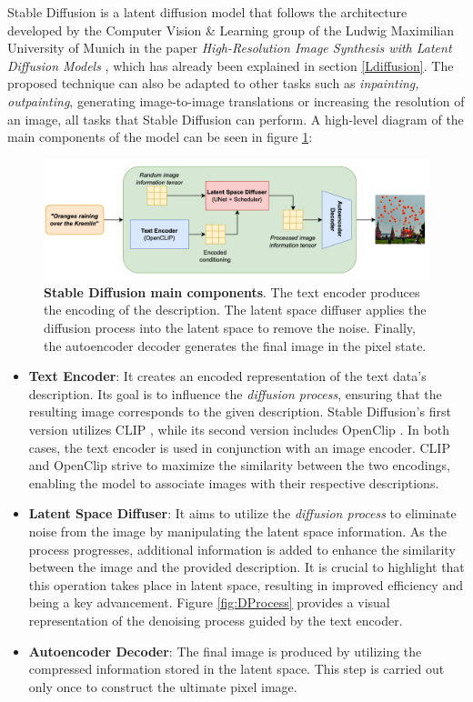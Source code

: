 Stable Diffusion is a latent diffusion model that follows the architecture developed by the Computer Vision \& Learning group of the Ludwig Maximilian University of Munich in the paper \textit{High-Resolution Image Synthesis with Latent Diffusion Models} \cite{rombach2022high}, which has already been explained in section \ref{Ldiffusion}. The proposed technique can also be adapted to other tasks such as \textit{inpainting, outpainting}, generating image-to-image translations or increasing the resolution of an image, all tasks that Stable Diffusion can perform. A high-level diagram of the main components of the model can be seen in figure \ref{fig:SDdiagram}:

\begin{figure}
    \centering
    \includegraphics[width=1\textwidth]{Pictures/SDdiagram.png} 
    \caption{\textbf{Stable Diffusion main components}. The text encoder produces the encoding of the description. The latent space diffuser applies the diffusion process into the latent space to remove the noise. Finally, the autoencoder decoder generates the final image in the pixel state.}
    \label{fig:SDdiagram}
\end{figure}

\begin{itemize}
    \item \textbf{Text Encoder}: It creates an encoded representation of the text data's description. Its goal is to influence the \textit{diffusion process}, ensuring that the resulting image corresponds to the given description. Stable Diffusion's first version utilizes CLIP \cite{radford2021learning}, while its second version includes OpenClip \cite{cherti2022reproducible}. In both cases, the text encoder is used in conjunction with an image encoder. CLIP and OpenClip strive to maximize the similarity between the two encodings, enabling the model to associate images with their respective descriptions.
    \item \textbf{Latent Space Diffuser}: It aims to utilize the \textit{diffusion process} to eliminate noise from the image by manipulating the latent space information. As the process progresses, additional information is added to enhance the similarity between the image and the provided description. It is crucial to highlight that this operation takes place in latent space, resulting in improved efficiency and being a key advancement. Figure \ref{fig:DProcess} provides a visual representation of the denoising process guided by the text encoder.
    \item \textbf{Autoencoder Decoder}: The final image is produced by utilizing the compressed information stored in the latent space. This step is carried out only once to construct the ultimate pixel image.
\end{itemize}

